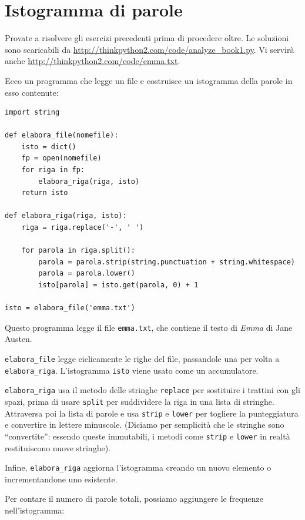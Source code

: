 \documentclass[10pt]{book}
\begin{document}
\section{Istogramma di parole}

Provate a risolvere gli esercizi precedenti prima di procedere oltre. Le soluzioni sono scaricabili da
 \url{http://thinkpython2.com/code/analyze_book1.py}.  Vi servirà anche \url{http://thinkpython2.com/code/emma.txt}.

Ecco un programma che legge un file e costruisce un istogramma della parole in esso contenute:

\begin{verbatim}
import string

def elabora_file(nomefile):
    isto = dict()
    fp = open(nomefile)
    for riga in fp:
        elabora_riga(riga, isto)
    return isto

def elabora_riga(riga, isto):
    riga = riga.replace('-', ' ')
    
    for parola in riga.split():
        parola = parola.strip(string.punctuation + string.whitespace)
        parola = parola.lower()
        isto[parola] = isto.get(parola, 0) + 1

isto = elabora_file('emma.txt')
\end{verbatim}
%
Questo programma legge il file {\tt emma.txt}, che contiene il testo di {\em
  Emma} di Jane Austen.

\verb"elabora_file" legge ciclicamente le righe del file, passandole una per volta a \verb"elabora_riga".  L'istogramma {\tt isto} viene usato come un accumulatore.

\verb"elabora_riga" usa il metodo delle stringhe {\tt replace} per sostituire i trattini con gli spazi, prima di usare {\tt split} per suddividere la riga in una lista di stringhe. Attraversa poi la lista di parole e usa {\tt strip}
e {\tt lower} per togliere la punteggiatura e convertire in lettere minuscole. (Diciamo per semplicità che le stringhe sono ``convertite'': essendo queste immutabili, i metodi come {\tt strip} e {\tt lower} in realtà restituiscono nuove stringhe).

Infine, \verb"elabora_riga" aggiorna l'istogramma creando un nuovo elemento o incrementandone uno esistente.

Per contare il numero di parole totali, possiamo aggiungere le frequenze nell'istogramma:
\end{document}
